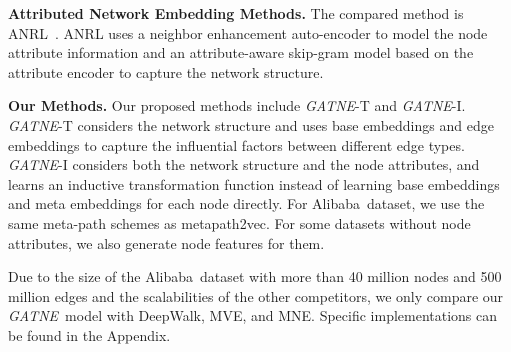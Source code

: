 \documentclass[sigconf]{acmart}
\newcommand{\company}{Alibaba}
\newcommand{\model}{{\em GATNE}}
\newcommand{\hide}[1]{} \newcommand{\jie}[1]{\textbf{\color{red}[(JT: #1 )]}}  \newcommand{\vpara}[1]{\vspace{0.07in}\noindent\textbf{#1 }}
\begin{document}
\vpara{Attributed Network Embedding Methods.}
The compared method is ANRL~\cite{zhang2018anrl}. ANRL uses a neighbor enhancement auto-encoder to model the node attribute information and an attribute-aware skip-gram model based on the attribute encoder to capture the network structure. 



\vpara{Our Methods.}
Our proposed methods include \model-T and \model-I. \model-T considers the network structure and uses base embeddings and edge embeddings to capture the influential factors between different edge types. \model-I considers both the network structure and the node attributes, and learns an inductive transformation function instead of learning base embeddings and meta embeddings for each node directly. For \company\ dataset, we use the same meta-path schemes as metapath2vec. For some datasets without node attributes, we also generate node features for them.
\hide{To analysis the effect of the aggregation and attention mechanism used in our model, we further conduct experiments on subtracting attention/aggregation part of our model, Namely \model-NoAttn and \model-NoAggr. Start from the \model-T model, for \model-NoAttn, after generating , we do not use the attention mechanism described in equation \ref{GATNE} and use Equation (\ref{MNE}) to generate overall embedding; for \model-NoAggr, we do not use aggregation as Equation (\ref{aggregation}) but simply take . }
Due to the size of the \company\  dataset with more than 40 million nodes and 500 million edges and the scalabilities of the other competitors, we only compare our \model\ model with DeepWalk, MVE, and MNE. Specific implementations can be found in the Appendix. 
\end{document}
